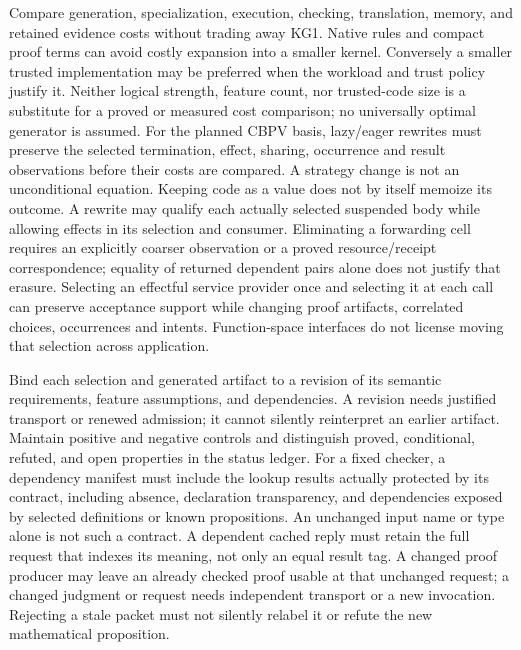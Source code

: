 \documentclass[11pt]{article}
\theoremstyle{definition}
\theoremstyle{remark}
\begin{document}
\begin{description}[leftmargin=1.2cm,style=nextline]
\item[KG5: End-to-end efficiency.]
  Compare generation, specialization, execution, checking, translation,
  memory, and retained evidence costs without trading away KG1. Native rules
  and compact proof terms can avoid costly expansion into a smaller kernel.
  Conversely a smaller trusted implementation may be preferred when the
  workload and trust policy justify it. Neither logical strength, feature
  count, nor trusted-code size is a substitute for a proved or measured cost
  comparison; no universally optimal generator is assumed.
  For the planned CBPV basis, lazy/eager rewrites must preserve the selected
  termination, effect, sharing, occurrence and result observations before their
  costs are compared. A strategy change is not an unconditional equation.
  Keeping code as a value does not by itself memoize its outcome. A rewrite
  may qualify each actually selected suspended body while allowing effects in
  its selection and consumer. Eliminating a forwarding cell requires an
  explicitly coarser observation or a proved resource/receipt correspondence;
  equality of returned dependent pairs alone does not justify that erasure.
  Selecting an effectful service provider once and selecting it at each call
  can preserve acceptance support while changing proof artifacts, correlated
  choices, occurrences and intents. Function-space interfaces do not license
  moving that selection across application.
\item[KG6: Revisable qualification.]
  Bind each selection and generated artifact to a revision of its semantic
  requirements, feature assumptions, and dependencies. A revision needs
  justified transport or renewed admission; it cannot silently reinterpret an
  earlier artifact. Maintain positive and negative controls and distinguish
  proved, conditional, refuted, and open properties in the status ledger.
  For a fixed checker, a dependency manifest must include the lookup results
  actually protected by its contract, including absence, declaration
  transparency, and dependencies exposed by selected definitions or known
  propositions. An unchanged input name or type alone is not such a contract.
  A dependent cached reply must retain the full request that indexes its
  meaning, not only an equal result tag. A changed proof producer may leave
  an already checked proof usable at that unchanged request; a changed
  judgment or request needs independent transport or a new invocation.
  Rejecting a stale packet must not silently relabel it or refute the new
  mathematical proposition.

\end{description}
\end{document}
